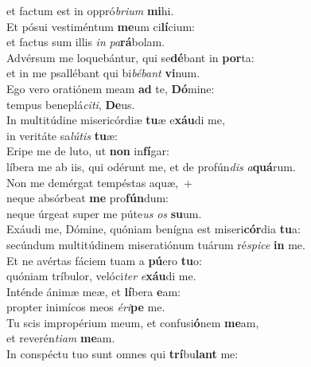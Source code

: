 \oddverse et factum est in oppró\textit{bri}\textit{um} \textbf{mi}hi.\\
\evenverse Et pósui vestiméntum \textbf{me}um ci\textbf{lí}cium:~\*\\
\evenverse et factus sum illis \textit{in} \textit{pa}\textbf{rá}bolam.\\
\oddverse Advérsum me loquebántur, qui se\textbf{dé}bant in \textbf{por}ta:~\*\\
\oddverse et in me psallébant qui bi\textit{bé}\textit{bant} \textbf{vi}num.\\
\evenverse Ego vero oratiónem meam \textbf{ad} te, \textbf{Dó}mine:~\*\\
\evenverse tempus beneplá\textit{ci}\textit{ti}, \textbf{De}us.\\
\oddverse In multitúdine misericórdiæ \textbf{tu}æ e\textbf{xáu}di me,~\*\\
\oddverse in veritáte sa\textit{lú}\textit{tis} \textbf{tu}æ:\\
\evenverse Eripe me de luto, ut \textbf{non} in\textbf{fí}gar:~\*\\
\evenverse líbera me ab iis, qui odérunt me, et de profún\textit{dis} \textit{a}\textbf{quá}rum.\\
\oddverse Non me demérgat tempéstas aquæ,~+\\
\oddverse  neque absórbeat \textbf{me} pro\textbf{fún}dum:~\*\\
\oddverse neque úrgeat super me púte\textit{us} \textit{os} \textbf{su}um.\\
\evenverse Exáudi me, Dómine, quóniam benígna est miseri\textbf{cór}dia \textbf{tu}a:~\*\\
\evenverse secúndum multitúdinem miseratiónum tuárum ré\textit{spi}\textit{ce} \textbf{in} me.\\
\oddverse Et ne avértas fáciem tuam a \textbf{pú}ero \textbf{tu}o:~\*\\
\oddverse quóniam tríbulor, velóci\textit{ter} \textit{e}\textbf{xáu}di me.\\
\evenverse Inténde ánimæ meæ, et \textbf{lí}bera \textbf{e}am:~\*\\
\evenverse propter inimícos meos \textit{é}\textit{ri}\textbf{pe} me.\\
\oddverse Tu scis impropérium meum, et confusi\textbf{ó}nem \textbf{me}am,~\*\\
\oddverse et reverén\textit{ti}\textit{am} \textbf{me}am.\\
\evenverse In conspéctu tuo sunt omnes qui \textbf{trí}bu\textbf{lant} me:~\*\\
